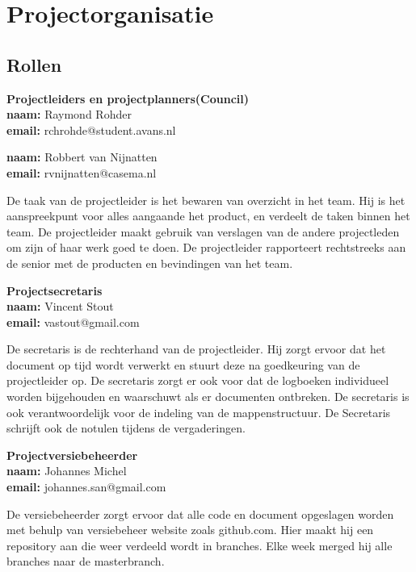 \chapter{Projectorganisatie} \label{cha:projectorganisatie}


\section{Rollen} \label{sec:basics}

\textbf{Projectleiders en projectplanners(Council)}\\
\textbf{naam:}	Raymond Rohder\\
\textbf{email:}	rchrohde@student.avans.nl

\bigskip
\textbf{naam:}	Robbert van Nijnatten\\
\textbf{email:}	rvnijnatten@casema.nl

\bigskip
De taak van de projectleider is het bewaren van overzicht in het team. Hij is het aanspreekpunt voor alles aangaande het product, en verdeelt de taken binnen het team. De projectleider maakt gebruik van verslagen van de andere projectleden om zijn of haar werk goed te doen. De projectleider rapporteert rechtstreeks aan de senior met de producten en bevindingen van het team.

\bigskip
\textbf{Projectsecretaris}\\
\textbf{naam:}	Vincent Stout\\
\textbf{email:}	vastout@gmail.com

\bigskip
De secretaris is de rechterhand van de projectleider. Hij zorgt ervoor dat het document op tijd wordt verwerkt en stuurt deze na goedkeuring van de projectleider op. De secretaris zorgt er ook voor dat de logboeken individueel worden bijgehouden en waarschuwt als er documenten ontbreken. De secretaris is ook verantwoordelijk voor de indeling van de mappenstructuur.
De Secretaris schrijft ook de notulen tijdens de vergaderingen.

\bigskip
\textbf{Projectversiebeheerder}\\
\textbf{naam:}	Johannes Michel\\
\textbf{email:}	johannes.san@gmail.com

\bigskip
De versiebeheerder zorgt ervoor dat alle code en document opgeslagen worden met behulp van versiebeheer website zoals github.com. Hier maakt hij een repository aan die weer verdeeld wordt in branches. Elke week merged hij alle branches naar de masterbranch.

